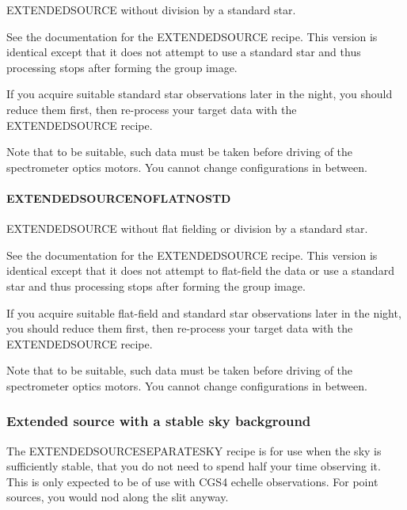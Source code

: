 \documentclass[twoside,11pt]{article}
\renewcommand{\_}{\texttt{\symbol{95}}}
\begin{document}
EXTENDED\_SOURCE without division by a standard star.


\mbox{}


See the documentation for the EXTENDED\_SOURCE recipe. This version is
identical except that it does not attempt to use a standard star and
thus processing stops after forming the group image.



If you acquire suitable standard star observations later in the night,
you should reduce them first, then re-process your target data with
the EXTENDED\_SOURCE recipe.



Note that to be suitable, such data must be taken before driving
of the spectrometer optics motors. You cannot change configurations
in between.

\paragraph{EXTENDED\_SOURCE\_NOFLAT\_NOSTD\label{EXTENDED_SOURCE_NOFLAT_NOSTD}}


EXTENDED\_SOURCE without flat fielding or
division by a standard star.


\mbox{}


See the documentation for the EXTENDED\_SOURCE recipe. This version is
identical except that it does not attempt to flat-field the data or
use a standard star and thus processing stops after forming the group
image.



If you acquire suitable flat-field and standard star observations later
in the night, you should reduce them first, then re-process your
target data with the EXTENDED\_SOURCE recipe.



Note that to be suitable, such data must be taken before driving
of the spectrometer optics motors. You cannot change configurations
in between.


\subsubsection{Extended source with a stable sky background}

The EXTENDED\_SOURCE\_SEPARATE\_SKY recipe is for use when the sky is
sufficiently stable, that you do not need to spend half your time
observing it. This is only expected to be of use with CGS4 echelle
observations. For point sources, you would nod along the slit anyway.
\end{document}
